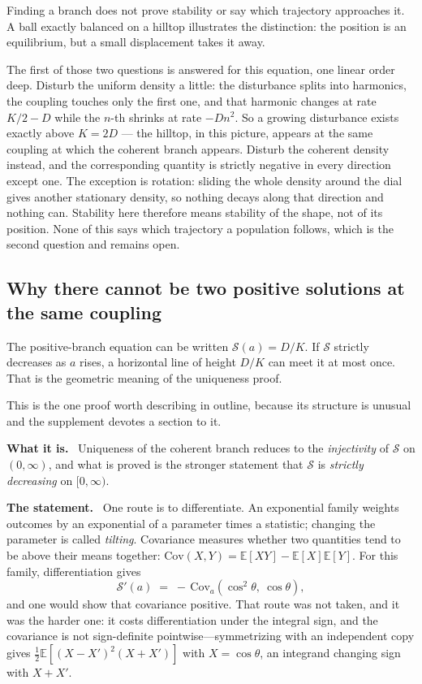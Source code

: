 \documentclass[11pt]{article}
\newcommand{\what}{\par\smallskip\noindent\textbf{What it is.}\ }
\newcommand{\statement}{\par\smallskip\noindent\textbf{The statement.}\ }
\newcommand{\E}{\mathbb{E}}
\begin{document}
Finding a branch does not prove stability or say which trajectory approaches
it. A ball exactly balanced on a hilltop illustrates the distinction: the
position is an equilibrium, but a small displacement takes it away.

The first of those two questions is answered for this equation, one linear
order deep. Disturb the uniform density a little: the disturbance splits into
harmonics, the coupling touches only the first one, and that harmonic changes
at rate $K/2-D$ while the $n$-th shrinks at rate $-Dn^2$. So a growing
disturbance exists exactly above $K=2D$ --- the hilltop, in this picture,
appears at the same coupling at which the coherent branch appears. Disturb the
coherent density instead, and the corresponding quantity is strictly negative
in every direction except one. The exception is rotation: sliding the whole
density around the dial gives another stationary density, so nothing decays
along that direction and nothing can. Stability here therefore means stability
of the shape, not of its position. None of this says which trajectory a
population follows, which is the second question and remains open.

\subsection{Why there cannot be two positive solutions at the same coupling}

The positive-branch equation can be written $\mathcal{S}(a)=D/K$. If $\mathcal{S}$ strictly
decreases as $a$ rises, a horizontal line of height $D/K$ can meet it at most
once. That is the geometric meaning of the uniqueness proof.

This is the one proof worth describing in outline, because its structure is
unusual and the supplement devotes a section to it.

\what
Uniqueness of the coherent branch reduces to the \emph{injectivity} of $\mathcal{S}$ on
$(0,\infty)$, and what is proved is the stronger statement that $\mathcal{S}$ is
\emph{strictly decreasing} on $[0,\infty)$.

\statement
One route is to differentiate. An exponential family weights outcomes by an
exponential of a parameter times a statistic; changing the parameter is called
\emph{tilting}. Covariance measures whether two quantities tend to be above
their means together: $\mathrm{Cov}(X,Y)=\E[XY]-\E[X]\E[Y]$.
For this family, differentiation gives
\[
 \mathcal{S}'(a) \;=\; -\,\mathrm{Cov}_a\!\left(\cos^2\theta,\ \cos\theta\right),
\]
and one would show that covariance positive. That route was not taken, and it
was the harder one: it costs differentiation under the integral sign, and the
covariance is not sign-definite pointwise---symmetrizing with an independent
copy gives $\tfrac12\E[(X-X')^2(X+X')]$ with $X=\cos\theta$, an integrand
changing sign with $X+X'$.
\end{document}
